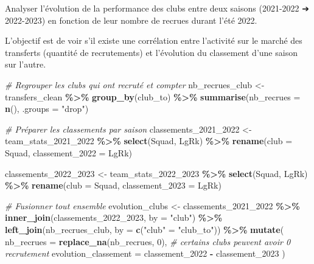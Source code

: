 \documentclass[
]{article}
\newenvironment{Shaded}{\begin{snugshade}}{\end{snugshade}}
\newcommand{\AttributeTok}[1]{\textcolor[rgb]{0.13,0.29,0.53}{#1}}
\newcommand{\CommentTok}[1]{\textcolor[rgb]{0.56,0.35,0.01}{\textit{#1}}}
\newcommand{\DecValTok}[1]{\textcolor[rgb]{0.00,0.00,0.81}{#1}}
\newcommand{\FunctionTok}[1]{\textcolor[rgb]{0.13,0.29,0.53}{\textbf{#1}}}
\newcommand{\NormalTok}[1]{#1}
\newcommand{\OtherTok}[1]{\textcolor[rgb]{0.56,0.35,0.01}{#1}}
\newcommand{\SpecialCharTok}[1]{\textcolor[rgb]{0.81,0.36,0.00}{\textbf{#1}}}
\newcommand{\StringTok}[1]{\textcolor[rgb]{0.31,0.60,0.02}{#1}}
\begin{document}
Analyser l'évolution de la performance des clubs entre deux saisons
(2021-2022 ➔ 2022-2023) en fonction de leur nombre de recrues durant
l'été 2022.

L'objectif est de voir s'il existe une corrélation entre l'activité sur
le marché des transferts (quantité de recrutements) et l'évolution du
classement d'une saison sur l'autre.

\begin{Shaded}
\begin{Highlighting}[]
\CommentTok{\# Regrouper les clubs qui ont recruté et compter}
\NormalTok{nb\_recrues\_club }\OtherTok{\textless{}{-}}\NormalTok{ transfers\_clean }\SpecialCharTok{\%\textgreater{}\%}
  \FunctionTok{group\_by}\NormalTok{(club\_to) }\SpecialCharTok{\%\textgreater{}\%}
  \FunctionTok{summarise}\NormalTok{(}\AttributeTok{nb\_recrues =} \FunctionTok{n}\NormalTok{(), }\AttributeTok{.groups =} \StringTok{"drop"}\NormalTok{)}

\CommentTok{\# Préparer les classements par saison}
\NormalTok{classements\_2021\_2022 }\OtherTok{\textless{}{-}}\NormalTok{ team\_stats\_2021\_2022 }\SpecialCharTok{\%\textgreater{}\%}
  \FunctionTok{select}\NormalTok{(Squad, LgRk) }\SpecialCharTok{\%\textgreater{}\%}
  \FunctionTok{rename}\NormalTok{(}\AttributeTok{club =}\NormalTok{ Squad, }\AttributeTok{classement\_2022 =}\NormalTok{ LgRk)}

\NormalTok{classements\_2022\_2023 }\OtherTok{\textless{}{-}}\NormalTok{ team\_stats\_2022\_2023 }\SpecialCharTok{\%\textgreater{}\%}
  \FunctionTok{select}\NormalTok{(Squad, LgRk) }\SpecialCharTok{\%\textgreater{}\%}
  \FunctionTok{rename}\NormalTok{(}\AttributeTok{club =}\NormalTok{ Squad, }\AttributeTok{classement\_2023 =}\NormalTok{ LgRk)}

\CommentTok{\# Fusionner tout ensemble}
\NormalTok{evolution\_clubs }\OtherTok{\textless{}{-}}\NormalTok{ classements\_2021\_2022 }\SpecialCharTok{\%\textgreater{}\%}
  \FunctionTok{inner\_join}\NormalTok{(classements\_2022\_2023, }\AttributeTok{by =} \StringTok{"club"}\NormalTok{) }\SpecialCharTok{\%\textgreater{}\%}
  \FunctionTok{left\_join}\NormalTok{(nb\_recrues\_club, }\AttributeTok{by =} \FunctionTok{c}\NormalTok{(}\StringTok{"club"} \OtherTok{=} \StringTok{"club\_to"}\NormalTok{)) }\SpecialCharTok{\%\textgreater{}\%}
  \FunctionTok{mutate}\NormalTok{(}
    \AttributeTok{nb\_recrues =} \FunctionTok{replace\_na}\NormalTok{(nb\_recrues, }\DecValTok{0}\NormalTok{),  }\CommentTok{\# certains clubs peuvent avoir 0 recrutement}
    \AttributeTok{evolution\_classement =}\NormalTok{ classement\_2022 }\SpecialCharTok{{-}}\NormalTok{ classement\_2023}
\NormalTok{  )}


\end{Highlighting}
\end{Shaded}
\end{document}
